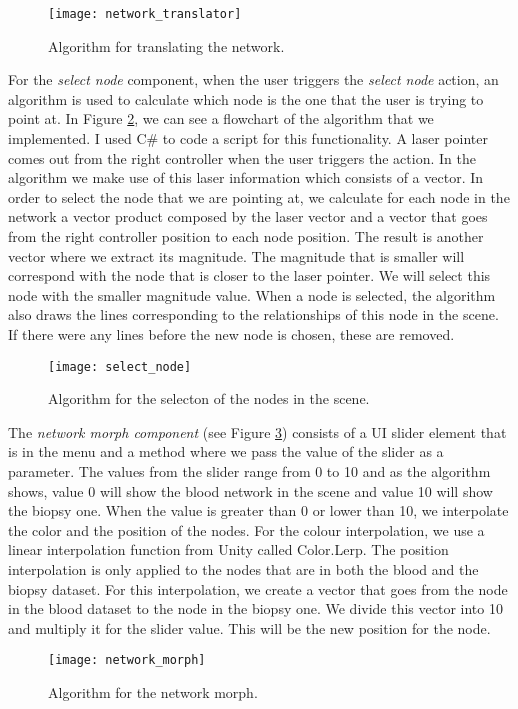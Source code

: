 \begin{figure}[h!]
    \centering%
    \texttt{[image: network\_translator]}
    \caption{Algorithm for translating the network.}
    \label{fig:network_translator}
\end{figure}%

For the \textit{select node} component, when the user triggers the \textit{select node} action, an algorithm is used to calculate which node is the one that the user is trying to point at. In Figure \ref{fig:select_node}, we can see a flowchart of the algorithm that we implemented. I used C\# to code a script for this functionality. A laser pointer comes out from the right controller when the user triggers the action. In the algorithm we make use of this laser information which consists of a vector. In order to select the node that we are pointing at, we calculate for each node in the network a vector product composed by the laser vector and a vector that goes from the right controller position to each node position. The result is another vector where we extract its magnitude. The magnitude that is smaller will correspond with the node that is closer to the laser pointer. We will select this node with the smaller magnitude value. When a node is selected, the algorithm also draws the lines corresponding to the relationships of this node in the scene. If there were any lines before the new node is chosen, these are removed.
\begin{figure}[h!]
    \centering%
    \texttt{[image: select\_node]}
    \caption{Algorithm for the selecton of the nodes in the scene.}
    \label{fig:select_node}
\end{figure}%

The \textit{network morph component} (see Figure \ref{fig:network_morph}) consists of a UI slider element that is in the menu and a method where we pass the value of the slider as a parameter. The values from the slider range from 0 to 10 and as the algorithm shows, value 0 will show the blood network in the scene and value 10 will show the biopsy one. When the value is greater than 0 or lower than 10, we interpolate the color and the position of the nodes. For the colour interpolation, we use a linear interpolation function from Unity called Color.Lerp. The position interpolation is only applied to the nodes that are in both the blood and the biopsy dataset. For this interpolation, we create a vector that goes from the node in the blood dataset to the node in the biopsy one. We divide this vector into 10 and multiply it for the slider value. This will be the new position for the node.
\begin{figure}[h!]
    \centering%
    \texttt{[image: network\_morph]}
    \caption{Algorithm for the network morph.}
    \label{fig:network_morph}
\end{figure}%

